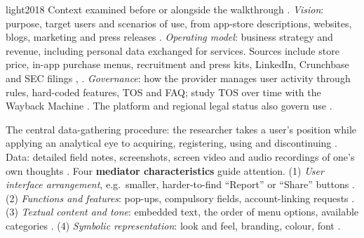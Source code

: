 \begin{papercard}{light2018}
 Context examined before or alongside the walkthrough . \emph{Vision}: purpose, target users and scenarios of use, from app-store descriptions, websites, blogs, marketing and press releases . \emph{Operating model}: business strategy and revenue, including personal data exchanged for services. Sources include store price, in-app purchase menus, recruitment and press kits, LinkedIn, Crunchbase and SEC filings , . \emph{Governance}: how the provider manages user activity through rules, hard-coded features, TOS and FAQ; study TOS over time with the Wayback Machine . The platform and regional legal status also govern use .

 The central data-gathering procedure: the researcher takes a user's position while applying an analytical eye to acquiring, registering, using and discontinuing . Data: detailed field notes, screenshots, screen video and audio recordings of one's own thoughts . Four \textbf{mediator characteristics} guide attention. (1) \emph{User interface arrangement}, e.g.\ smaller, harder-to-find ``Report'' or ``Share'' buttons . (2) \emph{Functions and features}: pop-ups, compulsory fields, account-linking requests . (3) \emph{Textual content and tone}: embedded text, the order of menu options, available categories . (4) \emph{Symbolic representation}: look and feel, branding, colour, font .


\end{papercard}
